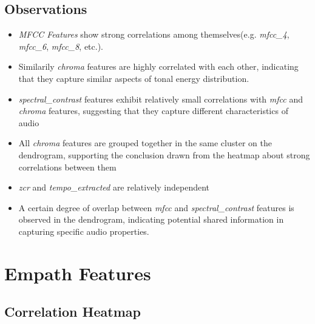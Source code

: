 \subsection*{Observations}
\begin{itemize}
  \item \textit{MFCC Features} show strong correlations among themselves(e.g.
    \textit{mfcc\_4}, \textit{mfcc\_6}, \textit{mfcc\_8}, etc.).
  \item Similarily \textit{chroma} features are highly correlated with each
    other, indicating that  they capture similar aspects of tonal energy
    distribution.
  \item \textit{spectral\_contrast} features exhibit relatively small
    correlations with \textit{mfcc} and  \textit{chroma} features, suggesting
    that they capture different characteristics of audio
  \item All \textit{chroma} features are grouped together in the same cluster
    on the dendrogram, supporting the conclusion drawn from the heatmap about
    strong correlations between them
  \item \textit{zcr} and \textit{tempo\_extracted} are relatively independent
  \item A certain degree of overlap between \textit{mfcc} and
    \textit{spectral\_contrast} features is observed in the dendrogram,
    indicating potential shared information in capturing specific audio
    properties.
\end{itemize}



\section{Empath Features}

\subsection*{Correlation Heatmap}
\label{sec:correlationheatmapsspotifyfeatures}


